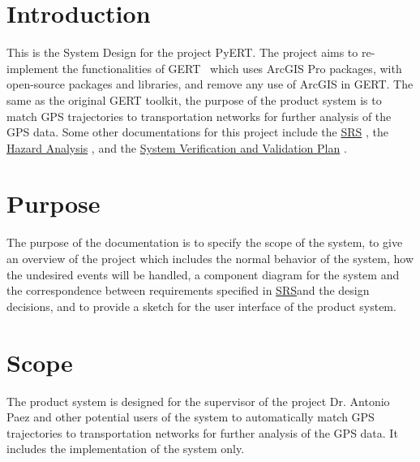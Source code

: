 \documentclass[12pt, titlepage]{article}
\begin{document}
\section{Introduction}
This is the System Design for the project PyERT. The project aims to re-implement the functionalities of GERT~\citep{DALUMPINES2018121} which uses ArcGIS Pro packages, with
open-source packages and libraries, and remove any use of ArcGIS in GERT. The same as the original GERT toolkit, the purpose of the product system is to match GPS trajectories to transportation networks for further analysis of the GPS data. Some other documentations for this project include the \href{https://github.com/paezha/PyERT-BLACK/blob/main/docs/SRS/SRS.pdf}{SRS} \citep{SRS}, the \href{https://github.com/paezha/PyERT-BLACK/blob/main/docs/HazardAnalysis/HazardAnalysis.pdf}{Hazard Analysis} \citep{HazardAnalysis}, and the \href{https://github.com/paezha/PyERT-BLACK/blob/main/docs/VnVPlan/VnVPlan.pdf}{System Verification and Validation Plan} \citep{VnVPlan}.


\section{Purpose}


The purpose of the documentation is to specify the scope of the system, to give an overview of the project which includes the normal behavior of the system, how the undesired events will be handled, a component diagram for the system and the correspondence between requirements specified in \href{https://github.com/paezha/PyERT-BLACK/blob/main/docs/SRS/SRS.pdf}{SRS}\citep{SRS}and the design decisions, and to provide a sketch for the user interface of the product system.

\section{Scope}

The product system is designed for the supervisor of the project Dr. Antonio Paez and other potential users of the system to automatically match GPS trajectories to transportation networks for further analysis of the GPS data. It includes the implementation of the system only. 
\end{document}
